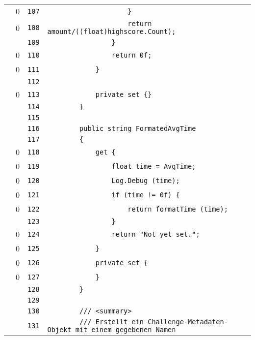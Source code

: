 \documentclass[a4paper,10pt]{article}
\begin{document}
\begin{longtable}[l]{lrrl}
\cellcolor{red} & 0 & \verb~107~ & \verb~                    }~\\
\cellcolor{red} & 0 & \verb~108~ & \verb~                    return amount/((float)highscore.Count);~\\
\cellcolor{gray} &  & \verb~109~ & \verb~                }~\\
\cellcolor{red} & 0 & \verb~110~ & \verb~                return 0f;~\\
\cellcolor{red} & 0 & \verb~111~ & \verb~            }~\\
\cellcolor{gray} &  & \verb~112~ & \verb~~\\
\cellcolor{red} & 0 & \verb~113~ & \verb~            private set {}~\\
\cellcolor{gray} &  & \verb~114~ & \verb~        }~\\
\cellcolor{gray} &  & \verb~115~ & \verb~~\\
\cellcolor{gray} &  & \verb~116~ & \verb~        public string FormatedAvgTime~\\
\cellcolor{gray} &  & \verb~117~ & \verb~        {~\\
\cellcolor{red} & 0 & \verb~118~ & \verb~            get {~\\
\cellcolor{red} & 0 & \verb~119~ & \verb~                float time = AvgTime;~\\
\cellcolor{red} & 0 & \verb~120~ & \verb~                Log.Debug (time);~\\
\cellcolor{red} & 0 & \verb~121~ & \verb~                if (time != 0f) {~\\
\cellcolor{red} & 0 & \verb~122~ & \verb~                    return formatTime (time);~\\
\cellcolor{gray} &  & \verb~123~ & \verb~                }~\\
\cellcolor{red} & 0 & \verb~124~ & \verb~                return "Not yet set.";~\\
\cellcolor{red} & 0 & \verb~125~ & \verb~            }~\\
\cellcolor{red} & 0 & \verb~126~ & \verb~            private set {~\\
\cellcolor{red} & 0 & \verb~127~ & \verb~            }~\\
\cellcolor{gray} &  & \verb~128~ & \verb~        }~\\
\cellcolor{gray} &  & \verb~129~ & \verb~~\\
\cellcolor{gray} &  & \verb~130~ & \verb~        /// <summary>~\\
\cellcolor{gray} &  & \verb~131~ & \verb~        /// Erstellt ein Challenge-Metadaten-Objekt mit einem gegebenen Namen ~\\

\end{longtable}
\end{document}
